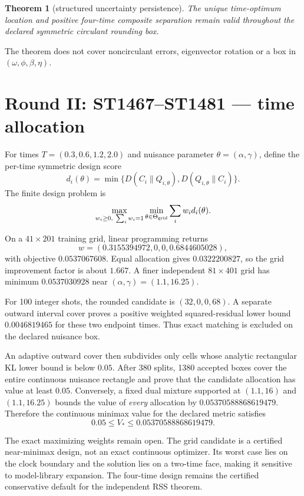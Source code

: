 \documentclass[11pt,a4paper]{article}
\newtheorem{theorem}{Theorem}\newcommand{\status}[1]{\textsf{[#1]}}
\begin{document}
\begin{theorem}[structured uncertainty persistence]
The unique time-optimum location and positive four-time composite separation
remain valid throughout the declared symmetric circulant rounding box.
\end{theorem}

The theorem does not cover noncirculant errors, eigenvector rotation or a box
in $(\omega,\phi,\beta,\eta)$.

\section{Round II: ST1467--ST1481 --- time allocation}

For times $T=(0.3,0.6,1.2,2.0)$ and nuisance parameter $\theta=(\alpha,\gamma)$,
define the per-time symmetric design score
\[
d_i(\theta)=\min\{D(C_i\|Q_{i,\theta}),D(Q_{i,\theta}\|C_i)\}.
\]
The finite design problem is
\[
\max_{w_i\ge0,\ \sum_iw_i=1}
\min_{\theta\in\Theta_{\rm grid}}\sum_iw_id_i(\theta).
\]

On a $41\times201$ training grid, linear programming returns
\[
w=(0.3155394972,0,0,0.6844605028),
\]
with objective $0.0537067608$.  Equal allocation gives $0.0322200827$, so the
grid improvement factor is about $1.667$.  A finer independent
$81\times401$ grid has minimum $0.0537030928$ near
$(\alpha,\gamma)=(1.1,16.25)$.

For 100 integer shots, the rounded candidate is $(32,0,0,68)$.  A separate
outward interval cover proves a positive weighted squared-residual lower bound
$0.0046819465$ for these two endpoint times.  Thus exact matching is excluded
on the declared nuisance box.

An adaptive outward cover then subdivides only cells whose analytic rectangular
KL lower bound is below $0.05$.  After 380 splits, 1380 accepted boxes cover the
entire continuous nuisance rectangle and prove that the candidate allocation
has value at least $0.05$.  Conversely, a fixed dual mixture supported at
$(1.1,16)$ and $(1.1,16.25)$ bounds the value of \emph{every} allocation by
$0.05370588868619479$.  Therefore the continuous minimax value for the declared
metric satisfies
\[
0.05\le V_*\le0.05370588868619479.
\]

The exact maximizing weights remain open.  The grid candidate is a certified
near-minimax design, not an exact continuous optimizer.  Its worst case lies on
the clock boundary and the solution lies on a two-time face, making it
sensitive to model-library expansion.  The four-time design remains the
certified conservative default for the independent RSS theorem.
\end{document}

